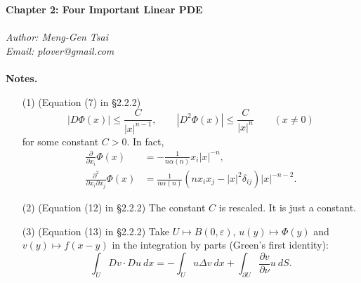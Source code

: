 \documentclass{article}
\begin{document}
\textbf{\Large Chapter 2: Four Important Linear PDE} \\\\



\emph{Author: Meng-Gen Tsai} \\
\emph{Email: plover@gmail.com} \\\\









\textbf{Notes.}
\begin{enumerate}
\item[(1)]
  (Equation (7) in \S 2.2.2)
  \[
    |D\Phi(x)| \leq \frac{C}{|x|^{n-1}}, \qquad
    |D^2\Phi(x)| \leq \frac{C}{|x|^{n}} \qquad (x \neq 0)
  \]
  for some constant $C > 0$.
  In fact,
  \begin{align*}
  \frac{\partial}{\partial x_i}\Phi(x)
  &= -\frac{1}{n\alpha(n)} x_i |x|^{-n}, \\
  \frac{\partial^2}{\partial x_i \partial x_j}\Phi(x)
  &= \frac{1}{n\alpha(n)} (n x_i x_j - |x|^2 \delta_{ij}) |x|^{-n-2}.
  \end{align*}

\item[(2)]
  (Equation (12) in \S 2.2.2)
  The constant $C$ is rescaled.
  It is just a constant.

\item[(3)]
  (Equation (13) in \S 2.2.2)
  Take $U \mapsto B(0,\varepsilon)$, $u(y) \mapsto \Phi(y)$ and $v(y) \mapsto f(x-y)$
  in the integration by parts (Green's first identity):
  \[
    \int_{U} Dv \cdot Du \: dx
    = -\int_{U} u \Delta v \: dx
      + \int_{\partial U} \frac{\partial v}{\partial \nu} u \: dS.
  \]

\end{enumerate}



\end{document}
